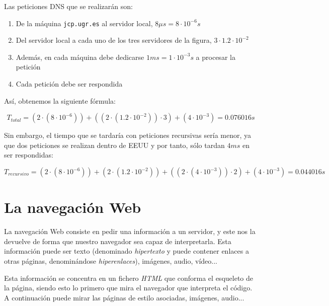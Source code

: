 \documentclass[10pt,a4paper,spanish]{report}
\begin{document}
Las peticiones DNS que se realizarán son:
\begin{enumerate}[\color{tema2}{$\longrightarrow$}]
  \item De la máquina \texttt{jcp.ugr.es} al servidor local, $8 \mu s = 8 \cdot 10^{-6} s$
  \item Del servidor local a cada uno de los tres servidores de la figura, $3 \cdot 1.2 \cdot 10^{-2}$
  \item Además, en cada máquina debe dedicarse $1 ms = 1 \cdot 10^{-3} s$ a procesar la petición
  \item Cada petición debe ser respondida
\end{enumerate}

Así, obtenemos la siguiente fórmula:

\begin{displaymath}
  T_{total} = (2 \cdot (8 \cdot 10^{-6})) + ((2 \cdot (1.2 \cdot 10^{-2})) \cdot 3) + (4 \cdot 10^{-3}) = 0.076016 s
\end{displaymath}

Sin embargo, el tiempo que se tardaría con peticiones recursivas sería menor, ya que dos peticiones se realizan dentro de EEUU y por tanto, sólo tardan $4 ms$ en ser respondidas:

\begin{displaymath}
  T_{recursivo} = (2 \cdot (8 \cdot 10^{-6})) + (2 \cdot (1.2 \cdot 10^{-2})) + ((2 \cdot (4 \cdot 10^{-3})) \cdot 2) + (4 \cdot 10^{-3}) = 0.044016s
\end{displaymath}

\section{\textcolor{tema2}La navegación Web}

La navegación Web consiste en pedir una información a un servidor, y este nos la devuelve de forma que nuestro navegador sea capaz de interpretarla. Esta información puede ser texto (denominado \textit{\textcolor{tema2}{hipertexto}} y puede contener enlaces a otras páginas, denominándose \textit{\textcolor{tema2}{hiperenlaces}}), imágenes, audio, vídeo...

Esta información se concentra en un fichero \textit{\textcolor{tema2}{HTML}} que conforma el esqueleto de la página, siendo esto lo primero que mira el navegador que interpreta el código. A continuación puede mirar las páginas de estilo asociadas, imágenes, audio...
\end{document}
